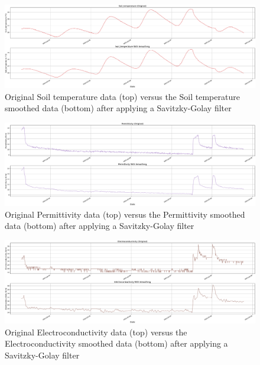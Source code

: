 \begin{figure}[htbp]
    \centering
    \includegraphics[width=15 cm]{5_ChapterDesign/figuras/2_Smoothing/Smoothing_Soil_temperature}
    \caption{Original Soil temperature data (top) versus the Soil temperature smoothed data (bottom) after applying a Savitzky-Golay filter}
    \label{Smoothing_Soil_temperature}
\end{figure}

\begin{figure}[htbp]
    \centering
    \includegraphics[width=15 cm]{5_ChapterDesign/figuras/2_Smoothing/Smoothing_Permittivity}
    \caption{Original Permittivity data (top) versus the Permittivity smoothed data (bottom) after applying a Savitzky-Golay filter}
    \label{Smoothing_Permittivity}
\end{figure}

\begin{figure}[htbp]
    \centering
    \includegraphics[width=15 cm]{5_ChapterDesign/figuras/2_Smoothing/Smoothing_Electroconductivity}
    \caption{Original Electroconductivity data (top) versus the Electroconductivity smoothed data (bottom) after applying a Savitzky-Golay filter}
    \label{Smoothing_Electroconductivity}
\end{figure}

